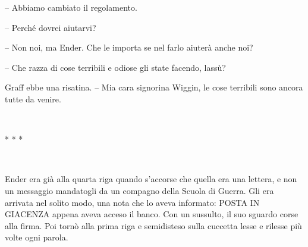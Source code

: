 {-- Abbiamo cambiato il regolamento.}

{-- Perché dovrei aiutarvi?}

{-- Non noi, ma Ender. Che le importa se nel farlo aiuterà anche noi?}

{-- Che razza di cose terribili e odiose gli state facendo, lassù?}

{Graff ebbe una risatina. -- Mia cara signorina Wiggin, le cose
	terribili sono ancora tutte da venire.}

{~}

\begin{center}
	{* * *}
\end{center}

{~}

{Ender era già alla quarta riga quando s'accorse che quella era una
	lettera, e non un messaggio mandatogli da un compagno della Scuola di
	Guerra. Gli era arrivata nel solito modo, una nota che lo aveva
	informato: POSTA IN GIACENZA appena aveva acceso il banco. Con un
	sussulto, il suo sguardo corse alla firma. Poi tornò alla prima riga e
	semidisteso sulla cuccetta lesse e rilesse più volte ogni parola.}

{~}

{~}

